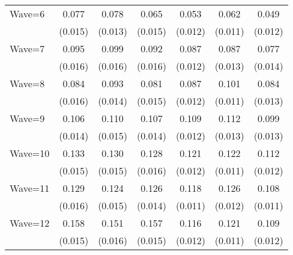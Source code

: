 {\begin{tabular}{l*{6}{c}}
Wave=6              &       0.077\sym{***}&       0.078\sym{***}&       0.065\sym{***}&       0.053\sym{***}&       0.062\sym{***}&       0.049\sym{***}\\
                    &     (0.015)         &     (0.013)         &     (0.015)         &     (0.012)         &     (0.011)         &     (0.012)         \\
Wave=7              &       0.095\sym{***}&       0.099\sym{***}&       0.092\sym{***}&       0.087\sym{***}&       0.087\sym{***}&       0.077\sym{***}\\
                    &     (0.016)         &     (0.016)         &     (0.016)         &     (0.012)         &     (0.013)         &     (0.014)         \\
Wave=8              &       0.084\sym{***}&       0.093\sym{***}&       0.081\sym{***}&       0.087\sym{***}&       0.101\sym{***}&       0.084\sym{***}\\
                    &     (0.016)         &     (0.014)         &     (0.015)         &     (0.012)         &     (0.011)         &     (0.013)         \\
Wave=9              &       0.106\sym{***}&       0.110\sym{***}&       0.107\sym{***}&       0.109\sym{***}&       0.112\sym{***}&       0.099\sym{***}\\
                    &     (0.014)         &     (0.015)         &     (0.014)         &     (0.012)         &     (0.013)         &     (0.013)         \\
Wave=10             &       0.133\sym{***}&       0.130\sym{***}&       0.128\sym{***}&       0.121\sym{***}&       0.122\sym{***}&       0.112\sym{***}\\
                    &     (0.015)         &     (0.015)         &     (0.016)         &     (0.012)         &     (0.011)         &     (0.012)         \\
Wave=11             &       0.129\sym{***}&       0.124\sym{***}&       0.126\sym{***}&       0.118\sym{***}&       0.126\sym{***}&       0.108\sym{***}\\
                    &     (0.016)         &     (0.015)         &     (0.014)         &     (0.011)         &     (0.012)         &     (0.011)         \\
Wave=12             &       0.158\sym{***}&       0.151\sym{***}&       0.157\sym{***}&       0.116\sym{***}&       0.121\sym{***}&       0.109\sym{***}\\
                    &     (0.015)         &     (0.016)         &     (0.015)         &     (0.012)         &     (0.011)         &     (0.012)         \\

\end{tabular}}
